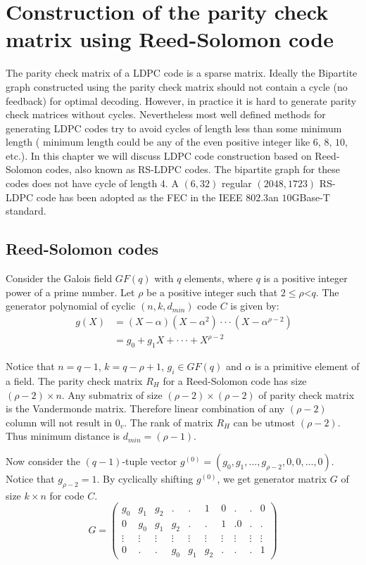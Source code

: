 \section{Construction of the parity check matrix using Reed-Solomon code}\label{chap:"RS"}

The parity check matrix of a LDPC code is a sparse matrix. Ideally the Bipartite graph constructed using the  parity check matrix should not contain a 
cycle (no feedback) for optimal decoding. However, in practice it is hard to generate parity check matrices without cycles. Nevertheless most well 
defined methods for generating LDPC codes try to avoid cycles of length less than some minimum length (
minimum length could be any of the even positive integer like $6$, $8$, $10$, etc.). In this chapter we will discuss LDPC code construction based on 
Reed-Solomon codes\cite{IEEE1}, also known as RS-LDPC codes. The bipartite graph for these codes does not have cycle of length 4. 
A $(6,32)$ regular $(2048,1723)$ RS-LDPC code has been adopted as the FEC in the IEEE $802.3$an $10$GBase-T standard\cite{IEEE}. 

\subsection{Reed-Solomon codes} 

Consider the Galois field $GF(q)$ with $q$ elements, where $q$ is a positive integer power of a prime number. Let $\rho$ be a positive integer 
such that $2 \leq \rho $<$ q$. The generator polynomial of cyclic $(n,k,d_{min})$ code $C$ is given by:
\begin{align}
\ g(X)&= (X-\alpha)(X-\alpha^2)\cdot\cdot\cdot(X-\alpha^{\rho-2})\\
\ &= g_0+g_1X+\cdot\cdot\cdot+X^{\rho-2}
\end{align} 

Notice that $n=q-1$, $k=q-\rho+1$, $g_i\in GF(q)$ and $\alpha$ is a primitive element of a field. The parity check matrix $R_H$ for a 
Reed-Solomon code has size  $(\rho -2) \times n$. Any submatrix of size $(\rho -2)\times(\rho -2)$ of parity check matrix is the Vandermonde matrix. 
Therefore linear combination of any $(\rho -2)$ column will not result in $0_v$. The rank of matrix $R_H$ can be utmost $(\rho -2)$. Thus minimum distance is $d_{min}=(\rho -1)$. 

Now consider the $(q-1)$-tuple vector $g^{(0)}=(g_0,g_1,...,g_{\rho-2},0,0,...,0)$. Notice that $g_{\rho-2}=1$. By cyclically shifting $g^{(0)}$, we get generator 
matrix $G$ of size $k\times n$ for code $C$.
\[ G= \left( \begin{array}{cccccccccc}
g_0 & g_1 & g_2 & . & . & 1 & 0 & . & . & 0\\
0 & g_0 & g_1 & g_2 & . & . & 1 & .0 & . & . \\
\vdots & \vdots & \vdots & \vdots & \vdots & \vdots & \vdots & \vdots & \vdots & \vdots\\
0 & . & . & g_0 & g_1 & g_2 & . & . & . & 1 \end{array} \right)\] 

